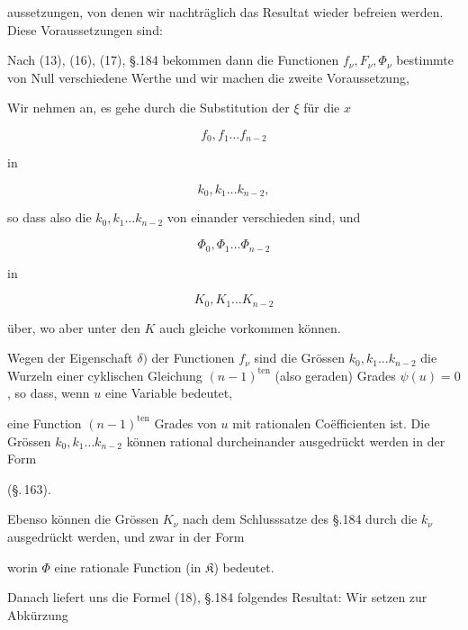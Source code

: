 aussetzungen, von denen wir nachträglich das Resultat wieder befreien
werden. Diese Voraussetzungen sind:


Nach (13), (16), (17), §.184 bekommen dann die Functionen $f_\nu, F_\nu,
\Phi_\nu$ bestimmte von Null verschiedene Werthe und wir machen die
zweite Voraussetzung,


Wir nehmen an, es gehe durch die Substitution der $\xi$ für die $x$

\[
f_0, f_1 \ldots f_{n-2}
\]

in

\[
k_0, k_1 \ldots k_{n-2},
\]

so dass also die $k_0, k_1 \ldots k_{n-2}$ von einander verschieden sind,
und

\[
\Phi_0, \Phi_1 \ldots \Phi_{n-2}
\]

in

\[
K_0, K_1 \ldots K_{n-2}
\]

über, wo aber unter den $K$ auch gleiche vorkommen können.

Wegen der Eigenschaft $\delta)$ der Functionen $f_\nu$ sind die Grössen
$k_0, k_1 \ldots k_{n-2}$ die Wurzeln einer cyklischen Gleichung
$(n-1)^{\text{ten}}$ (also geraden) Grades $\psi(u) = 0$, so dass, wenn
$u$ eine Variable bedeutet,


eine Function $(n-1)^{\text{ten}}$ Grades von $u$ mit rationalen
Coëfficienten ist. Die Grössen $k_0, k_1 \ldots k_{n-2}$ können rational
durcheinander ausgedrückt werden in der Form

(§.\,163).

Ebenso können die Grössen $K_\nu$ nach dem Schlusssatze des §.184 durch
die $k_\nu$ ausgedrückt werden, und zwar in der Form


worin $\Phi$ eine rationale Function (in $\mathfrak{K}$) bedeutet.

Danach liefert uns die Formel (18), §.184 folgendes Resultat: Wir setzen
zur Abkürzung

